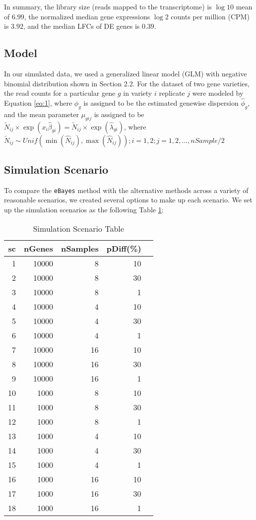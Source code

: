 In summary, the library size (reads mapped to the transcriptome) is $\log{10}$ mean of $6.99$, the normalized median gene expressions $\log{2}$ counts per million (CPM) is $3.92$, and the median LFCs of DE genes is $0.39$. 


\subsection{Model}

In our simulated data, we used a generalized linear model (GLM) with negative binomial distribution shown in Section 2.2. For the dataset of two gene varieties, the read counts for a particular gene $g$ in variety $i$ replicate $j$ were modeled by Equation \eqref{eq:1}, where $\phi_g$ is assigned to be the estimated genewise dispersion $\hat{\phi}_g$, and the mean parameter $\mu_{gij}$ is assigned to be $\tilde{N}_{ij}\times \exp(x_i \hat{\beta}_{gi}) = \tilde{N}_{ij}\times \exp(\hat{\lambda}_{gi})$, where $\tilde{N}_{ij} \sim Unif(\min(\hat{N}_{ij}), \max(\hat{N}_{ij})); i=1,2; j = 1,2,..., nSample/2$


\subsection{Simulation Scenario}

To compare the \texttt{eBayes} method with the alternative methods across a variety of reasonable scenarios, we created several options to make up each scenario. We set up the simulation scenarios as the following Table \ref{tab:Scenario}:

\begin{table}[H]
\centering
\begin{tabular}{|r|r|r|r|r|}
\hline
sc & nGenes & nSamples & pDiff(\%) \\ 
\hline
1 & 10000 & 8 & 10 \\ 
\hline
2 & 10000 & 8 & 30 \\ 
\hline
3 & 10000 & 8 & 1 \\
\hline
4 & 10000 & 4 & 10 \\
\hline
5 & 10000 & 4 & 30 \\
\hline
6 & 10000 & 4 & 1 \\ 
\hline
7 & 10000 & 16 & 10 \\
\hline
8 & 10000 & 16 & 30 \\ 
\hline
9 & 10000 & 16 & 1 \\
\hline
10& 1000 & 8 & 10 \\
\hline
11 & 1000 & 8 & 30 \\
\hline
12 & 1000 & 8 & 1 \\ 
\hline
13 & 1000 & 4 & 10 \\
\hline
14 & 1000 & 4 & 30 \\
\hline
15 & 1000 & 4 & 1 \\ 
\hline
16 & 1000 & 16 & 10 \\
\hline
17 & 1000 & 16 & 30 \\ 
\hline
18 & 1000 & 16 & 1 \\ 
\hline
\end{tabular}
\caption{Simulation Scenario Table}
\label{tab:Scenario}
\end{table}


